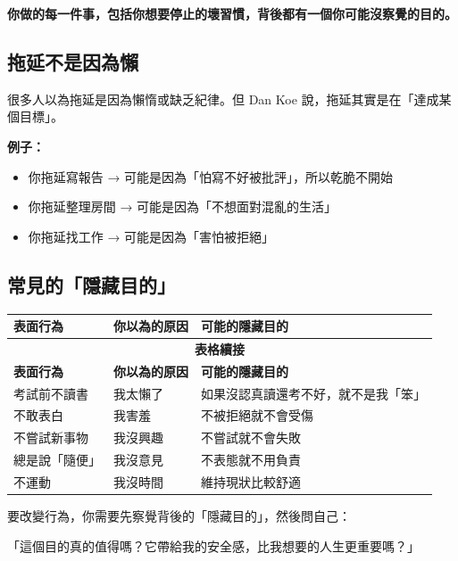 \documentclass[12pt,a4paper]{article}
\begin{document}
\begin{importantbox}
\textbf{你做的每一件事，包括你想要停止的壞習慣，背後都有一個你可能沒察覺的目的。}
\end{importantbox}

\subsection{拖延不是因為懶}

很多人以為拖延是因為懶惰或缺乏紀律。但 Dan Koe 說，拖延其實是在「達成某個目標」。

\textbf{例子：}
\begin{itemize}
    \item 你拖延寫報告 → 可能是因為「怕寫不好被批評」，所以乾脆不開始
    \item 你拖延整理房間 → 可能是因為「不想面對混亂的生活」
    \item 你拖延找工作 → 可能是因為「害怕被拒絕」
\end{itemize}

\subsection{常見的「隱藏目的」}

\begin{longtable}{p{4.5cm}p{4cm}p{5.5cm}}
\toprule
\textbf{表面行為} & \textbf{你以為的原因} & \textbf{可能的隱藏目的} \\
\midrule
\endfirsthead

\multicolumn{3}{c}{\textbf{表格續接}} \\
\toprule
\textbf{表面行為} & \textbf{你以為的原因} & \textbf{可能的隱藏目的} \\
\midrule
\endhead

\bottomrule
\endfoot

考試前不讀書 & 我太懶了 & 如果沒認真讀還考不好，\newline 就不是我「笨」 \\
\midrule
不敢表白 & 我害羞 & 不被拒絕就不會受傷 \\
\midrule
不嘗試新事物 & 我沒興趣 & 不嘗試就不會失敗 \\
\midrule
總是說「隨便」 & 我沒意見 & 不表態就不用負責 \\
\midrule
不運動 & 我沒時間 & 維持現狀比較舒適 \\
\bottomrule
\end{longtable}

\begin{tcolorbox}[colback=emergency_blue!5!white, colframe=emergency_blue, title=\textbf{這代表什麼？}]
要改變行為，你需要先察覺背後的「隱藏目的」，然後問自己：

「這個目的真的值得嗎？它帶給我的安全感，比我想要的人生更重要嗎？」
\end{tcolorbox}
\end{document}
